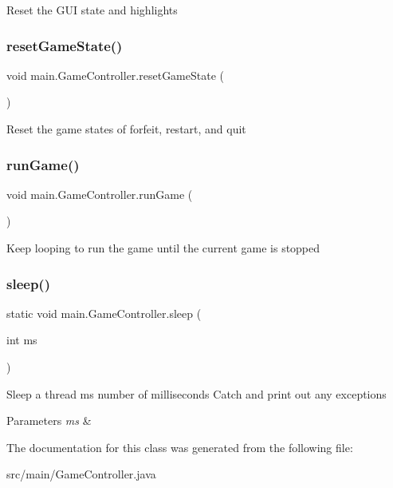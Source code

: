 Reset the G\+UI state and highlights \hypertarget{classmain_1_1_game_controller_aa8c33e3c78ef79c96207ee507fe4f29b}{}\label{classmain_1_1_game_controller_aa8c33e3c78ef79c96207ee507fe4f29b} 
\subsubsection{\texorpdfstring{reset\+Game\+State()}{resetGameState()}}
{\footnotesize\ttfamily void main.\+Game\+Controller.\+reset\+Game\+State (\begin{DoxyParamCaption}{ }\end{DoxyParamCaption})}

Reset the game states of forfeit, restart, and quit \hypertarget{classmain_1_1_game_controller_a988e49925efe78aff8e776af38964b7b}{}\label{classmain_1_1_game_controller_a988e49925efe78aff8e776af38964b7b} 
\subsubsection{\texorpdfstring{run\+Game()}{runGame()}}
{\footnotesize\ttfamily void main.\+Game\+Controller.\+run\+Game (\begin{DoxyParamCaption}{ }\end{DoxyParamCaption})}

Keep looping to run the game until the current game is stopped \hypertarget{classmain_1_1_game_controller_a92e6cb717e1d095d52e1f3db9899b3b4}{}\label{classmain_1_1_game_controller_a92e6cb717e1d095d52e1f3db9899b3b4} 
\subsubsection{\texorpdfstring{sleep()}{sleep()}}
{\footnotesize\ttfamily static void main.\+Game\+Controller.\+sleep (\begin{DoxyParamCaption}\item[{int}]{ms }\end{DoxyParamCaption})\hspace{0.3cm}{\ttfamily [static]}}

Sleep a thread ms number of milliseconds Catch and print out any exceptions 
\begin{DoxyParams}{Parameters}
{\em ms} & \\
\hline
\end{DoxyParams}


The documentation for this class was generated from the following file\+:\begin{DoxyCompactItemize}
\item 
src/main/Game\+Controller.\+java\end{DoxyCompactItemize}
